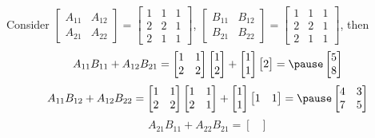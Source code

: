 \documentclass{beamer}
\theoremstyle{definition}
\theoremstyle{remark}
\begin{document}
\begin{frame}[t]
\begin{example}
Consider $\left[\begin{array}{c|c}
A_{11}&A_{12}\\
\hline
A_{21}&A_{22}
\end{array}\right]=
\left[\begin{array}{cc|c}
1&1&1\\
2&2&1\\
\hline
2&1&1
\end{array}\right]$, $\left[\begin{array}{c|c}
B_{11}&B_{12}\\
\hline
B_{21}&B_{22}
\end{array}\right]=
\left[\begin{array}{c|cc}
1&1&1\\
2&2&1\\
\hline
2&1&1
\end{array}\right]$\pause, then
\[
A_{11}B_{11}+A_{12}B_{21}=\begin{bmatrix}
1&1\\
2&2
\end{bmatrix}\begin{bmatrix}
1\\2
\end{bmatrix}+\begin{bmatrix}
1\\1
\end{bmatrix}\begin{bmatrix}
2
\end{bmatrix}=\pause\begin{bmatrix}
5\\8
\end{bmatrix}
\]
\[
A_{11}B_{12}+A_{12}B_{22}=\begin{bmatrix}
1&1\\
2&2
\end{bmatrix}\begin{bmatrix}
1&1\\
2&1
\end{bmatrix}+\begin{bmatrix}
1\\1
\end{bmatrix}\begin{bmatrix}
1&1
\end{bmatrix}=\pause\begin{bmatrix}
4&3\\7&5
\end{bmatrix}
\]
\[
A_{21}B_{11}+A_{22}B_{21}=\begin{bmatrix}

\end{bmatrix}\]
\end{example}
\end{frame}
\end{document}
